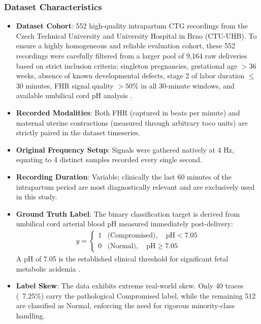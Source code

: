 \documentclass[conference]{IEEEtran}
\begin{document}
\subsubsection{Dataset Characteristics}

\begin{itemize}
    \item \textbf{Dataset Cohort}: 552 high-quality intrapartum CTG recordings
    from the Czech Technical University and University Hospital in Brno
    (CTU-UHB). To ensure a highly homogeneous and reliable evaluation cohort,
    these 552 recordings were carefully filtered from a larger pool of 9,164
    raw deliveries based on strict inclusion criteria: singleton pregnancies,
    gestational age $>36$ weeks, absence of known developmental defects,
    stage 2 of labor duration $\leq$ 30 minutes, FHR signal quality $>50$\% 
    in all 30-minute windows, and available umbilical cord pH analysis
    \cite{chudacek2014}.
    \item \textbf{Recorded Modalities}: Both FHR (captured in beats per minute) and maternal uterine contractions (measured through arbitrary toco units) are strictly paired in the dataset timeseries.
    \item \textbf{Original Frequency Setup}: Signals were gathered natively at 4 Hz, equating to 4 distinct samples recorded every single second.
    \item \textbf{Recording Duration}: Variable; clinically the last 60 minutes
    of the intrapartum period are most diagnostically relevant and are
    exclusively used in this study.
    \item \textbf{Ground Truth Label}: The binary classification target is
    derived from umbilical cord arterial blood pH measured immediately
    post-delivery:
    \begin{align}
        y =
        \begin{cases}
            1 & \text{(Compromised)}, \quad \text{pH} < 7.05 \\
            0 & \text{(Normal)},      \quad \text{pH} \geq 7.05
        \end{cases}
    \end{align}
    A pH of 7.05 is the established clinical threshold for significant fetal
    metabolic acidemia \cite{figo2015}.
    \item \textbf{Label Skew}: The data exhibits extreme real-world skew. Only 40 traces (~7.25\%) carry the pathological Compromised label, while the remaining 512 are classified as Normal, enforcing the need for rigorous minority-class handling.

\end{itemize}
\end{document}
